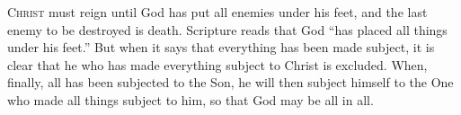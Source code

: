 \lettrine[lines=3,loversize=0.15]{C}{hrist} must reign until God has put all enemies under his feet, and the last enemy to be destroyed is death. Scripture reads that God “has placed all things under his feet.” But when it says that everything has been made subject, it is clear that he who has made everything subject to Christ is excluded. When, finally, all has been subjected to the Son, he will then subject himself to the One who made all things subject to him, so that God may be all in all.
